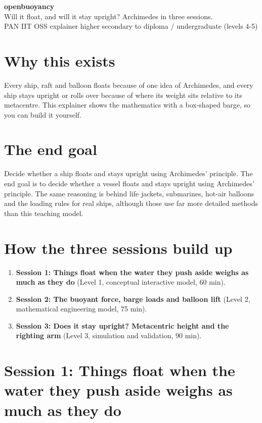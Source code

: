 \documentclass[11pt,a4paper]{article}
\begin{document}
\begin{center}{\LARGE\bfseries openbuoyancy}\\[0.4em]{\large Will it float, and will it stay upright? Archimedes in three sessions.}\\[0.2em]\small PAN IIT OSS explainer \textbullet{} higher secondary to diploma / undergraduate (levels 4-5)\end{center}

\section*{Why this exists}
Every ship, raft and balloon floats because of one idea of Archimedes, and every ship stays upright or rolls over because of where its weight sits relative to its metacentre. This explainer shows the mathematics with a box-shaped barge, so you can build it yourself.

\section*{The end goal}
Decide whether a ship floats and stays upright using Archimedes' principle. The end goal is to decide whether a vessel floats and stays upright using Archimedes' principle. The same reasoning is behind life jackets, submarines, hot-air balloons and the loading rules for real ships, although those use far more detailed methods than this teaching model.

\section*{How the three sessions build up}
\begin{enumerate}[nosep]
\item \textbf{Session 1: Things float when the water they push aside weighs as much as they do} (Level 1, conceptual interactive model, 60 min).
\item \textbf{Session 2: The buoyant force, barge loads and balloon lift} (Level 2, mathematical engineering model, 75 min).
\item \textbf{Session 3: Does it stay upright? Metacentric height and the righting arm} (Level 3, simulation and validation, 90 min).
\end{enumerate}

\section{Session 1: Things float when the water they push aside weighs as much as they do}
\end{document}
